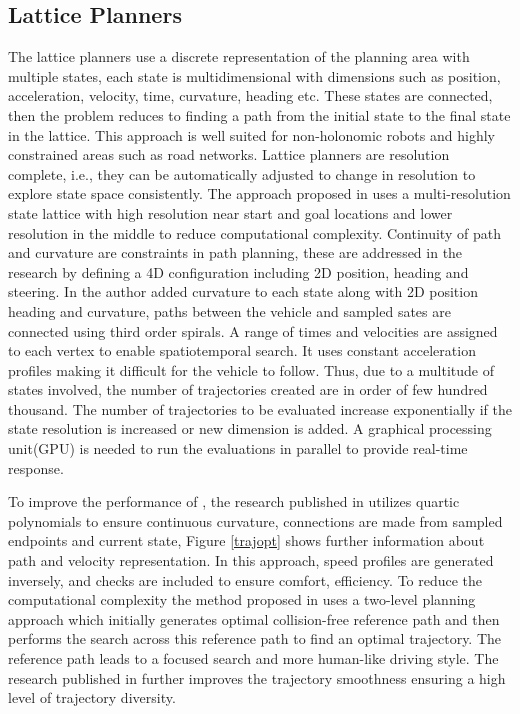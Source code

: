 \subsection{Lattice Planners}
\label{rw_lattice_planners}
The lattice planners use a discrete representation of the planning area with multiple states, each state is multidimensional with dimensions such as position, acceleration, velocity, time, curvature, heading etc. These states are connected, then the problem reduces to finding a path from the initial state to the final state in the lattice. This approach is well suited for non-holonomic robots and highly constrained areas such as road networks\cite{lattice_1}. Lattice planners are resolution complete, i.e., they can be automatically adjusted to change in resolution to explore state space consistently. The approach proposed in \cite{lattice_1} uses a multi-resolution state lattice with high resolution near start and goal locations and lower resolution in the middle to reduce computational complexity. Continuity of path and curvature are constraints in path planning, these are addressed in the research \cite{lattice_2} by defining a 4D configuration including 2D position, heading and steering. In \cite{cmu_parallel_thesis} the author added curvature to each state along with 2D position heading and curvature, paths between the vehicle and sampled sates are connected using third order spirals. A range of times and velocities are assigned to each vertex to enable spatiotemporal search. It uses constant acceleration profiles making it difficult for the vehicle to follow. Thus, due to a multitude of states involved, the number of trajectories created are in order of few hundred thousand. The number of trajectories to be evaluated increase exponentially if the state resolution is increased or new dimension is added. A graphical processing unit(GPU) is needed to run the evaluations in parallel to provide real-time response. 

To improve the performance of \cite{cmu_parallel_thesis}, the research published in \cite{traj_planner_optimization} utilizes quartic polynomials to ensure continuous curvature, connections are made from sampled endpoints and current state, Figure \ref{trajopt} shows further information about path and velocity representation. In this approach, speed profiles are generated inversely, and checks are included to ensure comfort, efficiency. To reduce the computational complexity the method proposed in \cite{traj_smoothing} uses a two-level planning approach which initially generates optimal collision-free reference path and then performs the search across this reference path to find an optimal trajectory. The reference path leads to a focused search and more human-like driving style. The research published in \cite{diss_shui_phd_thesis} further improves the trajectory smoothness ensuring a high level of trajectory diversity.

